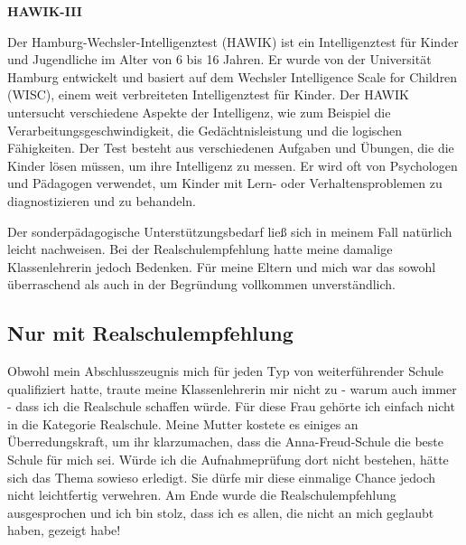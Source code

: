 \documentclass[fontsize=14pt,a4paper,headinclude,DIV=calc,automark]{scrbook}
\begin{document}
\begin{tcolorbox}[
    enhanced,
    breakable,
    colframe=rahmenlinie,      %
    colback=white,             %
    left=12pt, right=12pt,     %
    top=12pt, bottom=12pt,     %
    boxrule=0.3pt,             %
    arc=8pt                    %
]
\small\sffamily
\setlength{\parindent}{0pt} %

\textbf{HAWIK-III}

\vspace{0.5\baselineskip}

Der Hamburg-Wechsler-Intelligenztest (HAWIK) ist ein Intelligenztest für Kinder und Jugendliche im Alter von 6 bis 16 Jahren. Er wurde von der Universität Hamburg entwickelt und basiert auf dem Wechsler Intelligence Scale for Children (WISC), einem weit verbreiteten Intelligenztest für Kinder. Der HAWIK untersucht verschiedene Aspekte der Intelligenz, wie zum Beispiel die Verarbeitungsgeschwindigkeit, die Gedächtnisleistung und die logischen Fähigkeiten. Der Test besteht aus verschiedenen Aufgaben und Übungen, die die Kinder lösen müssen, um ihre Intelligenz zu messen. Er wird oft von Psychologen und Pädagogen verwendet, um Kinder mit Lern- oder Verhaltensproblemen zu diagnostizieren und zu behandeln.

\end{tcolorbox}

\vspace{0.8\baselineskip}

Der sonderpädagogische Unterstützungsbedarf ließ sich in meinem Fall natürlich leicht nachweisen. Bei der Realschulempfehlung hatte meine damalige Klassenlehrerin jedoch Bedenken. Für meine Eltern und mich war das sowohl überraschend als auch in der Begründung vollkommen unverständlich.

\subsection{Nur mit Realschulempfehlung}

Obwohl mein Abschlusszeugnis mich für jeden Typ von weiterführender Schule qualifiziert hatte, traute meine Klassenlehrerin mir nicht zu - warum auch immer - dass ich die Realschule schaffen würde. Für diese Frau gehörte ich einfach nicht in die Kategorie Realschule. Meine Mutter kostete es einiges an Überredungskraft, um ihr klarzumachen, dass die Anna-Freud-Schule die beste Schule für mich sei. Würde ich die Aufnahmeprüfung dort nicht bestehen, hätte sich das Thema sowieso erledigt. Sie dürfe mir diese einmalige Chance jedoch nicht leichtfertig verwehren. Am Ende wurde die Realschulempfehlung ausgesprochen und ich bin stolz, dass ich es allen, die nicht an mich geglaubt haben, gezeigt habe!
\end{document}
